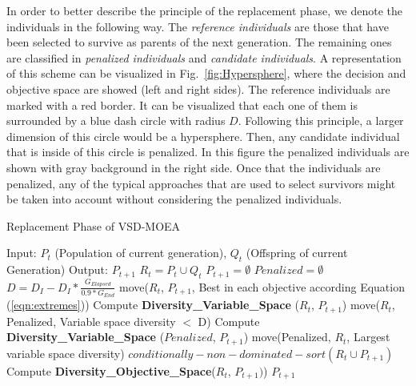 In order to better describe the principle of the replacement phase, we denote the individuals in the following way.
%
The \textit{reference individuals} are those that have been selected to survive as parents of the next generation. 
%
The remaining ones are classified in \textit{penalized individuals} and \textit{candidate individuals}.
%
A representation of this scheme can be visualized in Fig.~\ref{fig:Hypersphere}, where the decision and objective space are showed (left and right sides).
%
The reference individuals are marked with a red border.
%
It can be visualized that each one of them is surrounded by a blue dash circle with radius $D$.
%
Following this principle, a larger dimension of this circle would be a hypersphere.
%
Then, any candidate individual that is inside of this circle is penalized.
%
In this figure the penalized individuals are shown with gray background in the right side.
%
Once that the individuals are penalized, any of the typical approaches that are used to select survivors might be taken into account without considering the penalized individuals.


\begin{algorithm}[t]
  \scriptsize
	\caption{Replacement Phase of VSD-MOEA} 
\begin{algorithmic}[1]
\STATE Input: $P_t$ (Population of current generation), $Q_t$ (Offspring of current Generation)
    	\STATE Output: $P_{t+1}$ 
        \STATE $R_t = P_t \cup Q_t$ \label{alg:1}
        \STATE $P_{t+1} = \emptyset$ \label{alg:2}
        \STATE $Penalized = \emptyset$ \label{alg:3}
				\STATE $D = D_I - D_I * \frac{G_{Elapsed}}{0.9*G_{End}}$ \label{alg:4}
		\STATE move($R_t$,  $P_{t+1}$, Best in each objective according Equation (\ref{eqn:extremes})) \label{alg:5}
         \label{alg:6}
			\STATE Compute \textbf{Diversity\_Variable\_Space} ($R_t$, $P_{t+1}$) \label{alg:7}
		\STATE move($R_t$, Penalized, Variable space diversity $ < $ D)  \label{alg:8}
         \label{alg:9}
				\STATE Compute \textbf{Diversity\_Variable\_Space} ($Penalized$, $P_{t+1}$) \label{alg:10}
				\STATE move(Penalized, $R_t$, Largest variable space diversity) \label{alg:11}
        \ENDIF
		\STATE $conditionally-non-dominated-sort(R_t \cup P_{t+1}) $ \label{alg:12}
		\STATE Compute \textbf{Diversity\_Objective\_Space}($R_t$, $P_{t+1})$) \label{alg:13}
        \ENDWHILE
    	\RETURN $P_{t+1}$ \label{alg:14}
	\end{algorithmic}
\label{alg:Replacement_Phase}
\end{algorithm}


